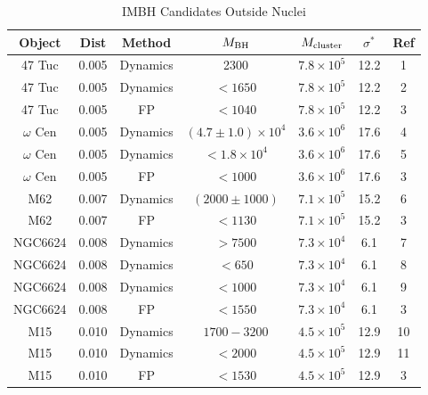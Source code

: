 \begin{table}
\caption{IMBH Candidates Outside Nuclei\label{tab:offnuclei}}
\begin{center}
  \begin{tabular}{ccccccc}
\hline
Object & Dist & Method & $M_{\rm BH}$ & $M_{\rm cluster}$ & $\sigma^*$ & Ref \\
\hline
47 Tuc             & 0.005 & Dynamics   &  2300                                  & $7.8 \times 10^5$ & 12.2   & 1 \\
47 Tuc             & 0.005 & Dynamics   & $< 1650$                               & $7.8 \times 10^5$ & 12.2    & 2 \\ 
47 Tuc             & 0.005 & FP              & $< 1040$                          & $7.8 \times 10^5$ & 12.2   & 3 \\
$\omega$ Cen       & 0.005  & Dynamics   & $(4.7 \pm1.0)  \times 10^4$           & $3.6 \times 10^6$ & 17.6    & 4 \\
$\omega$ Cen       & 0.005  & Dynamics   & $<1.8 \times 10^4$                    & $3.6 \times 10^6$ & 17.6   & 5 \\
$\omega$ Cen       & 0.005  & FP         &  $<1000$                              & $3.6 \times 10^6$ & 17.6   & 3 \\
M62                & 0.007  & Dynamics   &  $ (2000 \pm 1000) $                  & $7.1 \times 10^5$ & 15.2    & 6 \\
M62                & 0.007  & FP         &  $ < 1130$                            & $7.1 \times 10^5$ & 15.2   & 3 \\
NGC6624            & 0.008  &   Dynamics  &  $>7500$                             & $7.3 \times 10^4 $  & 6.1      & 7 \\
NGC6624            & 0.008  &   Dynamics  &  $< 650$                             & $7.3 \times 10^4 $  & 6.1      & 8 \\
NGC6624            & 0.008  &   Dynamics  &  $< 1000$                            & $7.3 \times 10^4 $  & 6.1      & 9 \\
NGC6624            & 0.008  &   FP        &  $<1550$                             & $7.3 \times 10^4 $  & 6.1   & 3 \\
M15                 & 0.010  &   Dynamics &  $1700-3200$                        & $4.5 \times 10^5 $  & 12.9  & 10 \\
M15                 & 0.010  &   Dynamics &  $<2000$                             & $4.5 \times 10^5 $  & 12.9  & 11 \\
M15                 & 0.010  &   FP       &  $<1530$                             & $4.5 \times 10^5 $  & 12.9  & 3 \\

\end{tabular}
\end{center}
\end{table}
